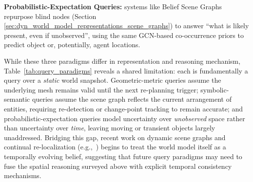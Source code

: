 \noindent\textbf{Probabilistic-Expectation Queries:} %
systems like Belief Scene Graphs \cite{saucedo_estimating_2025} repurpose blind nodes (Section \ref{sec:dyn_world_model_representations_scene_graphs}) to answer ``what is likely present, even if unobserved'', using the same GCN-based co-occurrence priors to predict object or, potentially, agent locations.

While these three paradigms differ in representation and reasoning mechanism, Table~\ref{tab:query_paradigms} reveals a shared limitation: each is fundamentally a query over a \textit{static} world snapshot. 
Geometric-metric queries assume the underlying mesh remains valid until the next re-planning trigger; symbolic-semantic queries assume the scene graph reflects the current arrangement of entities, requiring re-detection or change-point tracking to remain accurate; and probabilistic-expectation queries model uncertainty over \textit{unobserved} space rather than uncertainty over \textit{time}, leaving moving or transient objects largely unaddressed. 
Bridging this gap, recent work on dynamic scene graphs and continual re-localization (e.g.,~\cite{ejaz2025situationallyawarepathplanningexploiting}) begins to treat the world model itself as a temporally evolving belief, suggesting that future query paradigms may need to fuse the spatial reasoning surveyed above with explicit temporal consistency mechanisms.

